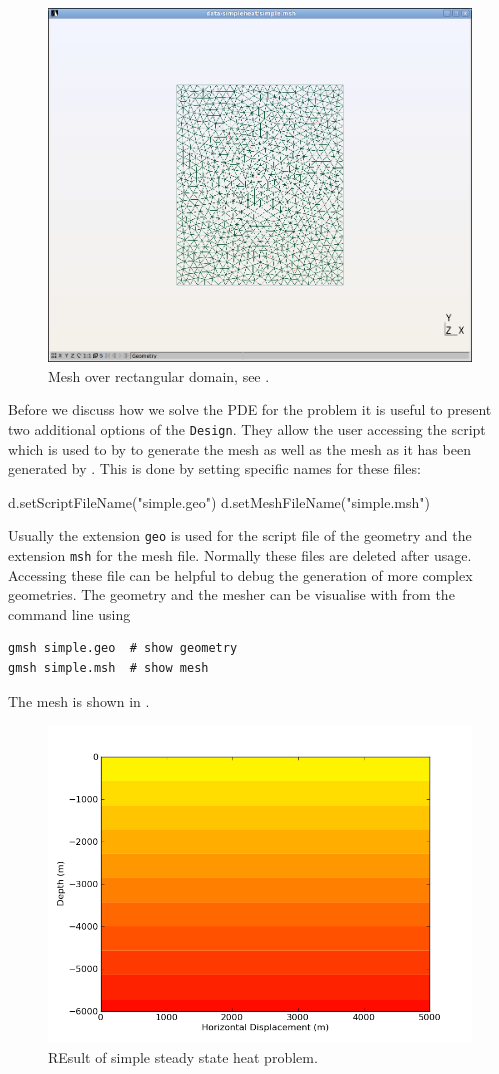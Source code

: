 \begin{figure}[ht]
\centerline{\includegraphics[width=4.in]{figures/simplemesh}}
\caption{Mesh over rectangular domain, see .}
\label{fig:pycad rec mesh}
\end{figure}

Before we discuss how we solve the PDE for the 
problem it is useful to present two additional options of the \verb|Design|. 
They allow the user accessing the script which is used to by \gmsh to generate the mesh as well as
the mesh as it has been generated by \gmsh. This is done by setting specific names for these files: 
\begin{python}
d.setScriptFileName("simple.geo")
d.setMeshFileName("simple.msh")
\end{python}
Usually the extension \texttt{geo} is used for the script file of the \gmsh geometry and
the extension \texttt{msh} for the mesh file. Normally these files are deleted after usage. 
Accessing these file can be helpful to debug the generation of more complex geometries. The geometry and the mesher can be visualise with \gmsh from the command line using
\begin{verbatim}
gmsh simple.geo  # show geometry
gmsh simple.msh  # show mesh
\end{verbatim}
The mesh is shown in .
\begin{figure}[ht]
\centerline{\includegraphics[width=4.in]{figures/simpleheat}}
\caption{REsult of simple steady state heat problem.}
\label{fig:steady state heat}
\end{figure}


